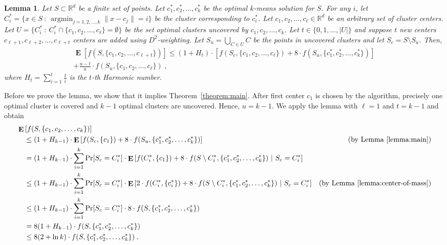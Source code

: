 \documentclass{article}
\newtheorem{lemma}{Lemma}
\newcommand{\R}{\mathbb{R}}
\newcommand{\norm}[1]{\|{#1}\|}
\DeclareMathOperator*{\argmin}{argmin}
\DeclareMathOperator*{\Exp}{\mathbf{E}}
\begin{document}
\begin{lemma}
\label{lemma:main}
Let $S \subset \R^d$ be a finite set of points. Let $c^*_1, c^*_2, \dots, c^*_k$
be the optimal $k$-means solution for $S$. For any $i$, let $C^*_i = \{ x \in S ~:~
\argmin_{j=1,2,\dots,k} \norm{x - c_j} = i\}$ be the cluster corresponding to
$c^*_i$. Let $c_1, c_2, \dots, c_\ell \in \R^d$ be an arbitrary set of cluster
centers. Let $U = \{ C_i^* ~:~ C_i^* \cap \{c_1, c_2, \dots, c_\ell\} =
\emptyset \}$ be the set optimal clusters uncovered by $c_1, c_2, \dots, c_k$.
Let $t \in \{0, 1, \dots, |U|\}$ and suppose $t$ new centers $c_{\ell+1},
c_{\ell+2}, \dots, c_{\ell+t}$ centers are added using $D^2$-weighting. Let $S_u =
\bigcup_{C \in U} C$ be the points in uncovered clusters and let $S_c = S
\setminus S_u$. Then,
\begin{multline}
\label{equation:main-lemma}
\Exp \left[ f(S, \{c_1, c_2, \dots, c_{\ell+t}\}) \right]
\le (1 + H_t) \cdot \left[f(S_c, \{c_1, c_2, \dots, c_\ell\}) + 8 \cdot f(S_u, \{c^*_1, c^*_2, \dots, c^*_k\}) \right] \\
 + \frac{u-t}{u} \cdot f(S_u, \{c_1, c_2, \dots, c_\ell\} ) \; ,
\end{multline}
where $H_t = \sum_{i=1}^t \frac{1}{i}$ is the $t$-th Harmonic number.
\end{lemma}

Before we prove the lemma, we show that it implies Theorem~\ref{theorem:main}.
After first center $c_1$ is chosen by the algorithm, precisely one optimal cluster
is covered and $k-1$ optimal clusters are uncovered. Hence, $u=k-1$.
We apply the lemma with $\ell=1$ and $t=k-1$ and obtain
\begin{align*}
& \Exp \left[ f(S, \{c_1, c_2, \dots, c_k\}) \right] \\
& \quad \le (1 + H_{k-1}) \cdot \Exp\left[f(S_c, \{c_1\}) + 8 \cdot f(S_u, \{c^*_1, c^*_2, \dots, c^*_k\}) \right] & \text{(by Lemma~\ref{lemma:main})} \\
& \quad = (1 + H_{k-1}) \cdot \sum_{i=1}^k \Pr[S_c = C^*_i] \cdot \Exp\left[f(C^*_i, \{c_1\}) + 8 \cdot f(S \setminus C^*_i, \{c^*_1, c^*_2, \dots, c^*_k\}) ~\middle|~ S_c = C^*_i \right] \\
& \quad \le (1 + H_{k-1}) \cdot \sum_{i=1}^k \Pr[S_c = C^*_i] \cdot \Exp\left[2 \cdot f(C^*_i, \{c^*_i\}) + 8 \cdot f(S \setminus C^*_i, \{c^*_1, c^*_2, \dots, c^*_k\}) ~\middle|~ S_c = C^*_i \right] & \text{(by Lemma~\ref{lemma:center-of-mass})}  \\
& \quad \le (1 + H_{k-1}) \cdot \sum_{i=1}^k \Pr[S_c = C^*_i] \cdot 8 \cdot f(S, \{c^*_1, c^*_2, \dots, c^*_k\}) \\
& \quad = 8 (1 + H_{k-1}) \cdot f(S, \{c^*_1, c^*_2, \dots, c^*_k\}) \\
& \quad \le 8 (2 + \ln k) \cdot f(S, \{c^*_1, c^*_2, \dots, c^*_k\}) \; .
\end{align*}
\end{document}
